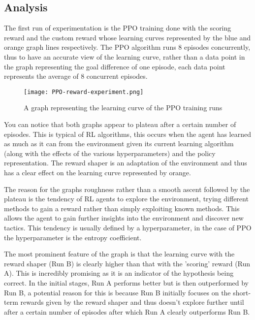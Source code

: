 \documentclass[11pt]{article}
\begin{document}
\subsection{Analysis}
The first run of experimentation is the PPO training done with the scoring reward and the custom reward whose learning curves represented by the blue and orange graph lines respectively. The PPO algorithm runs 8 episodes concurrently, thus to have an accurate view of the learning curve, rather than a data point in the graph representing the goal difference of one episode, each data point represents the average of 8 concurrent episodes.

\begin{figure}[!h]
    \centering
    \texttt{[image: PPO-reward-experiment.png]}
    \caption{A graph representing the learning curve of the PPO training runs}
    \label{fig:PPO-exp-gd}
\end{figure}

You can notice that both graphs appear to plateau after a certain number of episodes. This is typical of RL algorithms, this occurs when the agent has learned as much as it can from the environment given its current learning algorithm (along with the effects of the various hyperparameters) and the policy representation. The reward shaper is an adaptation of the environment and thus has a clear effect on the learning curve represented by orange.

The reason for the graphs roughness rather than a smooth ascent followed by the plateau is the tendency of RL agents to explore the environment, trying different methods to gain a reward rather than simply exploiting known methods. This allows the agent to gain further insights into the environment and discover new tactics. This tendency is usually defined by a hyperparameter, in the case of PPO the hyperparameter is the entropy coefficient.

The most prominent feature of the graph is that the learning curve with the reward shaper (Run B) is clearly higher than that with the 'scoring' reward (Run A). This is incredibly promising as it is an indicator of the hypothesis being correct. In the initial stages, Run A performs better but is then outperformed by Run B, a potential reason for this is because Run B initially focuses on the short-term rewards given by the reward shaper and thus doesn't explore further until after a certain number of episodes after which Run A clearly outperforms Run B.
\end{document}
